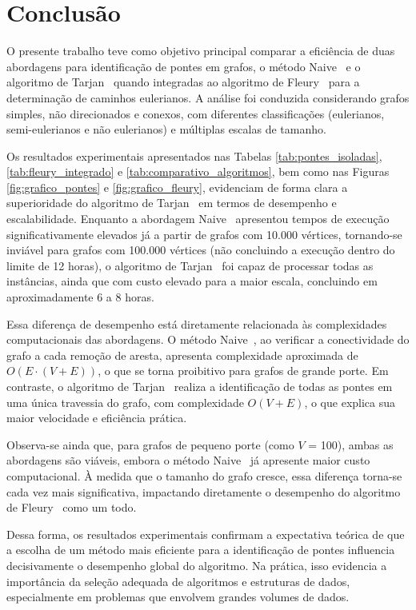 \documentclass{sbc2023}%
\begin{document}
\section{Conclusão}

O presente trabalho teve como objetivo principal comparar a eficiência de duas abordagens para identificação de pontes em grafos, o método Naive~\cite{cormen2022Naive} e o algoritmo de Tarjan~\cite{tarjan1972dfs} quando integradas ao algoritmo de Fleury~\cite{AlgoFleury} para a determinação de caminhos eulerianos. A análise foi conduzida considerando grafos simples, não direcionados e conexos, com diferentes classificações (eulerianos, semi-eulerianos e não eulerianos) e múltiplas escalas de tamanho.

Os resultados experimentais apresentados nas Tabelas \ref{tab:pontes_isoladas}, \ref{tab:fleury_integrado} e \ref{tab:comparativo_algoritmos}, bem como nas Figuras \ref{fig:grafico_pontes} e \ref{fig:grafico_fleury}, evidenciam de forma clara a superioridade do algoritmo de Tarjan~\cite{tarjan1972dfs} em termos de desempenho e escalabilidade. Enquanto a abordagem Naive~\cite{cormen2022Naive} apresentou tempos de execução significativamente elevados já a partir de grafos com 10.000 vértices, tornando-se inviável para grafos com 100.000 vértices (não concluindo a execução dentro do limite de 12 horas), o algoritmo de Tarjan~\cite{tarjan1972dfs} foi capaz de processar todas as instâncias, ainda que com custo elevado para a maior escala, concluindo em aproximadamente 6 a 8 horas.

Essa diferença de desempenho está diretamente relacionada às complexidades computacionais das abordagens. O método Naive~\cite{cormen2022Naive}, ao verificar a conectividade do grafo a cada remoção de aresta, apresenta complexidade aproximada de $O(E⋅(V+E))$, o que se torna proibitivo para grafos de grande porte. Em contraste, o algoritmo de Tarjan~\cite{tarjan1972dfs} realiza a identificação de todas as pontes em uma única travessia do grafo, com complexidade $O(V+E)$, o que explica sua maior velocidade e eficiência prática.

Observa-se ainda que, para grafos de pequeno porte (como $V$ = 100), ambas as abordagens são viáveis, embora o método Naive~\cite{cormen2022Naive} já apresente maior custo computacional. À medida que o tamanho do grafo cresce, essa diferença torna-se cada vez mais significativa, impactando diretamente o desempenho do algoritmo de Fleury~\cite{AlgoFleury} como um todo.

Dessa forma, os resultados experimentais confirmam a expectativa teórica de que a escolha de um método mais eficiente para a identificação de pontes influencia decisivamente o desempenho global do algoritmo. Na prática, isso evidencia a importância da seleção adequada de algoritmos e estruturas de dados, especialmente em problemas que envolvem grandes volumes de dados.
\end{document}
